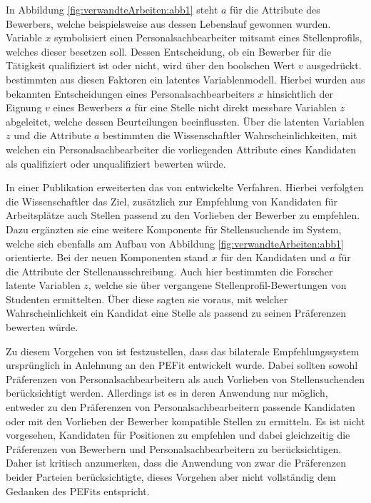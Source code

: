 In Abbildung \ref{fig:verwandteArbeiten:abb1} steht $a$ für die Attribute des Bewerbers, welche beispielsweise aus dessen Lebenslauf gewonnen wurden. Variable $x$ symbolisiert einen Personalsachbearbeiter mitsamt eines Stellenprofils, welches dieser besetzen soll. Dessen Entscheidung, ob ein Bewerber für die Tätigkeit qualifiziert ist oder nicht, wird über den boolschen Wert $v$ ausgedrückt. \textcite[S. 4ff.]{faerber:2003} bestimmten aus diesen Faktoren ein latentes Variablenmodell. Hierbei wurden aus bekannten Entscheidungen eines Personalsachbearbeiters $x$ hinsichtlich der Eignung $v$ eines Bewerbers $a$ für eine Stelle nicht direkt messbare Variablen $z$ abgeleitet, welche dessen Beurteilungen beeinflussten. Über die latenten Variablen $z$ und die Attribute $a$ bestimmten die Wissenschaftler Wahrscheinlichkeiten, mit welchen ein Personalsachbearbeiter die vorliegenden Attribute eines Kandidaten als qualifiziert oder unqualifiziert bewerten würde.

In einer Publikation erweiterten \textcite[S. 4f.]{malinowski:2006} das von \textcite[S. 4ff.]{faerber:2003} entwickelte Verfahren. Hierbei verfolgten die Wissenschaftler das Ziel, zusätzlich zur Empfehlung von Kandidaten für Arbeitsplätze auch Stellen passend zu den Vorlieben der Bewerber zu empfehlen. Dazu ergänzten sie eine weitere Komponente für Stellensuchende im System, welche sich ebenfalls am Aufbau von Abbildung \ref{fig:verwandteArbeiten:abb1} orientierte. Bei der neuen Komponenten stand $x$ für den Kandidaten und $a$ für die Attribute der Stellenausschreibung. Auch hier bestimmten die Forscher latente Variablen $z$, welche sie über vergangene Stellenprofil-Bewertungen von Studenten ermittelten. Über diese sagten sie voraus, mit welcher Wahrscheinlichkeit ein Kandidat eine Stelle als passend zu seinen Präferenzen bewerten würde. 

Zu diesem Vorgehen von \textcite[S. 3ff.]{malinowski:2006} ist festzustellen, dass das bilaterale Empfehlungssystem ursprünglich in Anlehnung an den \ac{PEFit} entwickelt wurde. Dabei sollten sowohl Präferenzen von Personalsachbearbeitern als auch Vorlieben von Stellensuchenden berücksichtigt werden. Allerdings ist es in deren Anwendung nur möglich, entweder zu den Präferenzen von Personalsachbearbeitern passende Kandidaten oder mit den Vorlieben der Bewerber kompatible Stellen zu ermitteln. Es ist nicht vorgesehen, Kandidaten für Positionen zu empfehlen und dabei gleichzeitig die Präferenzen von Bewerbern und Personalsachbearbeitern zu berücksichtigen. Daher ist kritisch anzumerken, dass die Anwendung von \textcite[S. 3ff.]{malinowski:2006} zwar die Präferenzen beider Parteien berücksichtigte, dieses Vorgehen aber nicht vollständig dem Gedanken des \acp{PEFit} entspricht.


